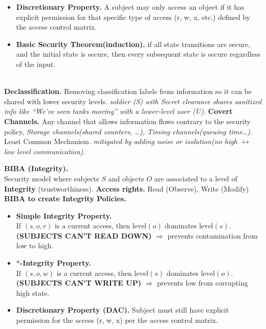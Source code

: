 \documentclass[main.tex]{subfiles}
\begin{document}
\begin{minipage}[t]{0.495\textwidth}
\begin{minipage}[t]{0.5\textwidth}
\begin{itemize}[itemsep=2pt]
			\item[] \textbf{Discretionary Property.}
			      A subject may only access an object if it has explicit permission for that specific type of access (r, w, x, etc.) defined by the access control matrix.
			\item[] \textbf{Basic Security Theorem(induction).} if all state transitions are secure, and the initial state is secure, then every subsequent state is secure regardless of the input.
		\end{itemize}
	\end{minipage}\\
	\textbf{Declassification.} Removing classification labels from information so it can be shared with lower security levels. \textit{soldier (S) with \textit{Secret} clearance shares sanitized info like “We’ve seen tanks moving” with a lower-level user (U).}
	\hline
	\textbf{Covert Channels.} Any channel that allows information flows contrary to the security policy, \textit{Storage channels(shared counters, \dots), Timing channels(queuing time\dots).} \\\warning Least Common Mechanism.
	\textit{mitigated by adding noise or isolation(no high $\leftrightarrow$ low level communication).}
	\hline
	\begin{minipage}[t]{0.5\textwidth}
		\textbf{BIBA (Integrity).} \\Security model where subjects $S$ and objects $O$ are associated to a level of \textbf{Integrity} (trustworthiness). \textbf{Access rights.} Read (Observe), Write (Modify)\\
		\textbf{BIBA to create Integrity Policies.}
		\begin{itemize}[itemsep=2pt]
			\item[] \textbf{Simple Integrity Property.}\\
			      If $(s,o,r)$ is a current access, then $\text{level}(o)$ dominates $\text{level}(s)$.\\
			      \textbf{(SUBJECTS CAN'T READ DOWN)} $\Rightarrow$ prevents contamination from low to high.
			\item[]\textbf{$\ast$-Integrity Property.}\\ If $(s,o,w)$ is a current access, then $\text{level}(s)$ dominates $\text{level}(o)$.\\
			      \textbf{(SUBJECTS CAN'T WRITE UP)} $\Rightarrow$ prevents low from corrupting high state.
			\item[] \textbf{Discretionary Property (DAC).} Subject must still have explicit permission for the access (r, w, x) per the access control matrix.

\end{itemize}
\end{minipage}
\end{minipage}
\end{document}
